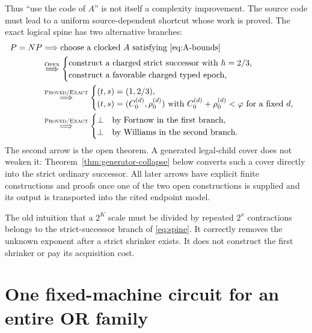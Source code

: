 \documentclass[11pt]{article}
\newcommand{\Exact}{\textsc{Proved/Exact}}
\newcommand{\Open}{\textsc{Open}}
\begin{document}
Thus ``use the code of $A$'' is not itself a complexity improvement.  The
source code must lead to a uniform source-dependent shortcut whose work is
proved.  The exact logical spine has two alternative branches:
\begin{equation}
\begin{split}
 P=NP
 &\Longrightarrow \text{choose a clocked }A\text{ satisfying
 \eqref{eq:A-bounds}}\\
 &\mathrel{\mathop{\Longrightarrow}^{\Open}}
   \begin{cases}
    \text{construct a charged strict successor with }h=2/3,\\
    \text{construct a favorable charged typed epoch,}
   \end{cases}\\
 &\mathrel{\mathop{\Longrightarrow}^{\Exact}}
   \begin{cases}
    (t,s)=(1,2/3),\\
    (t,s)=(C_0^{(d)},\rho_0^{(d)})
      \text{ with }C_0^{(d)}+\rho_0^{(d)}<\varphi
      \text{ for a fixed }d,
   \end{cases}\\
 &\mathrel{\mathop{\Longrightarrow}^{\Exact}}
   \begin{cases}
    \bot\quad\text{by Fortnow in the first branch},\\
    \bot\quad\text{by Williams in the second branch}.
   \end{cases}
\end{split}
\label{eq:spine}
\end{equation}
The second arrow is the open theorem.  A generated legal-child cover does not
weaken it: Theorem~\ref{thm:generator-collapse} below converts such a cover
directly into the strict ordinary successor.  All later arrows have explicit
finite constructions and proofs once one of the two open constructions is
supplied and its output is transported into the cited endpoint model.

The old intuition that a $2^K$ scale must be divided by repeated $2^x$
contractions belongs to the strict-successor branch of \eqref{eq:spine}.  It
correctly
removes the unknown exponent after a strict shrinker exists.  It does not
construct the first shrinker or pay its acquisition cost.

\section{One fixed-machine circuit for an entire OR family}
\end{document}
